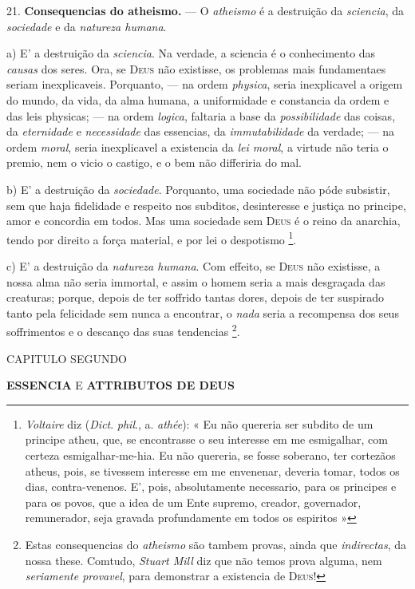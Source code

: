 21. \textbf{Consequencias do atheismo.} --- O \emph{atheismo} é a destruição da \emph{sciencia}, da \emph{sociedade} e da \emph{natureza humana}.

 a) E' a destruição da \emph{sciencia}. Na verdade, a sciencia é o conhecimento das \emph{causas} dos seres. Ora, se \textsc{Deus} não existisse, os problemas mais fundamentaes seriam inexplicaveis. Porquanto, --- na ordem \emph{physica}, seria inexplicavel a origem do mundo, da vida, da alma humana, a uniformidade e constancia da ordem e das leis physicas; --- na ordem \emph{logica}, faltaria a base da \emph{possibilidade} das coisas, da \emph{eternidade} e \emph{necessidade} das essencias, da \emph{immutabilidade} da verdade; --- na ordem \emph{moral}, seria inexplicavel a existencia da \emph{lei moral}, a virtude não teria o premio, nem o vicio o castigo, e o bem não differiria do mal.

b) E' a destruição da \emph{sociedade}. Porquanto, uma sociedade não póde subsistir, sem que haja fidelidade e respeito nos subditos, desinteresse e justiça no principe, amor e concordia em todos. Mas uma sociedade sem \textsc{Deus} é o reino da anarchia, tendo por direito a força material, e por lei o despotismo \footnote{\emph{Voltaire} diz (\emph{Dict}. \emph{phil}., a. \emph{athée}): « Eu não quereria ser subdito de um principe atheu, que, se encontrasse o seu interesse em me esmigalhar, com certeza esmigalhar-me-hia. Eu não quereria, se fosse soberano, ter cortezãos atheus, pois, se tivessem interesse em me envenenar, deveria tomar, todos os dias, contra-venenos. E', pois, absolutamente necessario, para os principes e para os povos, que a idea de um Ente supremo, creador, governador, remunerador, seja gravada profundamente em todos os espiritos »}.

c) E' a destruição da \emph{natureza humana}. Com effeito, se \textsc{Deus} não existisse, a nossa alma não seria immortal, e assim o homem seria a mais desgraçada das creaturas; porque, depois de ter soffrido tantas dores, depois de ter suspirado tanto pela felicidade sem nunca a encontrar, o \emph{nada} seria a recompensa dos seus soffrimentos e o descanço das suas tendencias \footnote{Estas consequencias do \emph{atheismo} são tambem provas, ainda que \emph{indirectas}, da nossa these. Comtudo, \emph{Stuart Mill} diz que não temos prova alguma, nem \emph{seriamente provavel}, para demonstrar a existencia de \textsc{Deus}!}.

 CAPITULO SEGUNDO

\textbf{ESSENCIA} E \textbf{ATTRIBUTOS DE DEUS}

